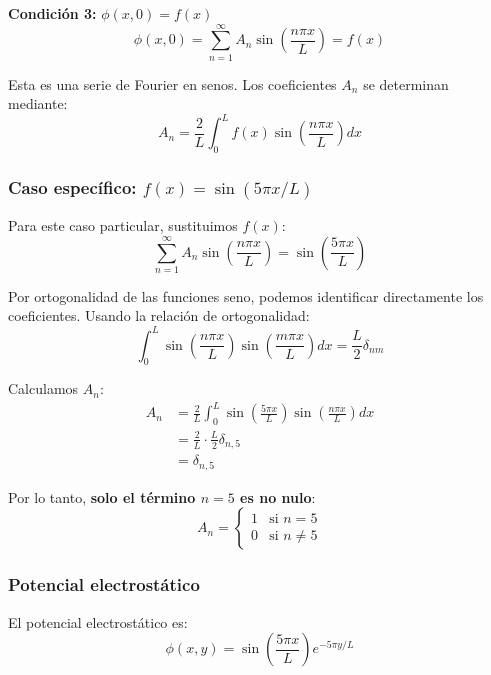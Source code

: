 \documentclass[a4paper]{article}
\begin{document}
\textbf{Condición 3:} $\phi(x, 0) = f(x)$
\begin{equation}
\phi(x, 0) = \sum_{n=1}^{\infty} A_n \sin\left(\frac{n\pi x}{L}\right) = f(x)
\end{equation}

Esta es una serie de Fourier en senos. Los coeficientes $A_n$ se determinan mediante:
\begin{equation}
A_n = \frac{2}{L} \int_0^L f(x) \sin\left(\frac{n\pi x}{L}\right) dx
\end{equation}

\subsubsection{Caso específico: $f(x) = \sin(5\pi x/L)$}

Para este caso particular, sustituimos $f(x)$:
\begin{equation}
\sum_{n=1}^{\infty} A_n \sin\left(\frac{n\pi x}{L}\right) = \sin\left(\frac{5\pi x}{L}\right)
\end{equation}

Por ortogonalidad de las funciones seno, podemos identificar directamente los coeficientes. Usando la relación de ortogonalidad:
\begin{equation}
\int_0^L \sin\left(\frac{n\pi x}{L}\right) \sin\left(\frac{m\pi x}{L}\right) dx = \frac{L}{2} \delta_{nm}
\end{equation}

Calculamos $A_n$:
\begin{align}
A_n &= \frac{2}{L} \int_0^L \sin\left(\frac{5\pi x}{L}\right) \sin\left(\frac{n\pi x}{L}\right) dx \\
&= \frac{2}{L} \cdot \frac{L}{2} \delta_{n,5} \\
&= \delta_{n,5}
\end{align}

Por lo tanto, \textbf{solo el término $n=5$ es no nulo}:
\begin{equation}
A_n = \begin{cases}
1 & \text{si } n = 5 \\
0 & \text{si } n \neq 5
\end{cases}
\end{equation}

\subsubsection{Potencial electrostático}

El potencial electrostático es:
\begin{equation}
\boxed{\phi(x, y) = \sin\left(\frac{5\pi x}{L}\right) e^{-5\pi y/L}}
\end{equation}
\end{document}
